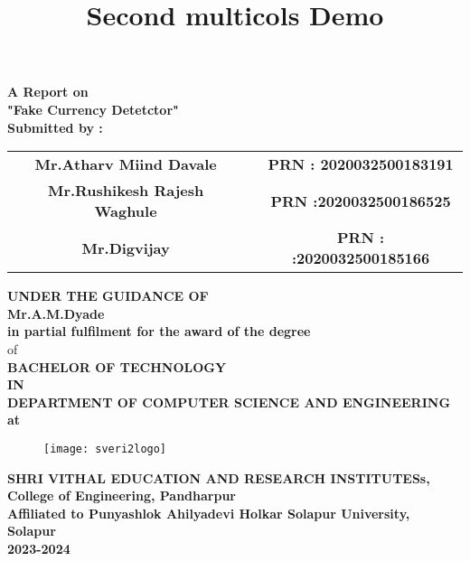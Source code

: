 \documentclass[12pt]{article}
\title{Second multicols Demo}
\begin{document}
 \begin{center}
 \large \textbf {A Report on}\\[2mm]
 \LARGE \textbf {"Fake Currency Detetctor"}\\[7mm]
 
 \textbf{Submitted by :}\\[2mm]
 \end{center}
 
 
 \begin{tabular}{ c c c } 
 \textbf{Mr.Atharv Miind Davale} & \hspace{1.1in} & \textbf{ PRN :  2020032500183191} \\ [1mm] 
 \textbf {Mr.Rushikesh Rajesh Waghule} & \hspace{1.1in} & \textbf{PRN :2020032500186525}\\[1mm]
 \textbf{ Mr.Digvijay  } & \hspace{1.1in}  & \textbf{PRN : :2020032500185166}\\[7mm]
 \end{tabular} 
 
 
 
 \begin{center}
 \large \textbf {UNDER THE GUIDANCE OF }\\[2mm]
 \large \textbf {Mr.A.M.Dyade}\\[7mm]
 \textbf {in partial fulfilment for the award of the degree} \\[2mm] of \\[2mm]
 
 \large \textbf {BACHELOR OF TECHNOLOGY}\\[2mm]
 \textbf {IN}\\[2mm]
 \textbf {DEPARTMENT OF COMPUTER SCIENCE AND ENGINEERING}\\
 \textbf {at}
 \end{center}
 
 \begin{figure}[h]
 \centering
 \texttt{[image: sveri2logo]}
\end{figure} 

\begin{center}
\textbf{SHRI VITHAL EDUCATION AND RESEARCH INSTITUTESs,\\[2mm]
College of Engineering, Pandharpur\\[3mm]
Affiliated to Punyashlok Ahilyadevi Holkar Solapur University, Solapur\\[2mm]
2023-2024}
\end{center}  
 
\end{document}
